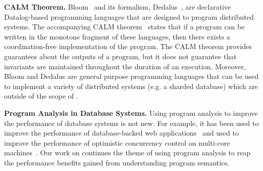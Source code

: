 \textbf{CALM Theorem.}
Bloom~\cite{alvaro2010boom, alvaro2011consistency, conway2012logic} and its
formalism, Dedalus~\cite{alvaro2011dedalus, alvaro2013declarative}, are
declarative Datalog-based programming languages that are designed to program
distributed systems. The accompanying CALM
theorem~\cite{hellerstein2010declarative, ameloot2013relational} states that if
a program can be written in the monotone fragment of these languages, then
there exists a coordination-free implementation of the program.  The CALM
theorem provides guarantees about the outputs of a program, but it does not
guarantee that invariants are maintained throughout the duration of an
execution. Moreover, Bloom and Dedalus are general purpose programming
languages that can be used to implement a variety of distributed systems (e.g.
a sharded database) which are outside of the scope of \invariantconfluence{}.

\textbf{Program Analysis in Database Systems.}
Using program analysis to improve the performance of database systems is not
new. For example, it has been used to improve the performance of
database-backed web applications~\cite{cheung2014using, wu2016transaction,
ramachandra2012program} and used to improve the performance of optimistic
concurrency control on multi-core machines~\cite{wu2016transaction}. Our work
on \invariantconfluence{} continues the theme of using program analysis to reap
the performance benefits gained from understanding program semantics.
